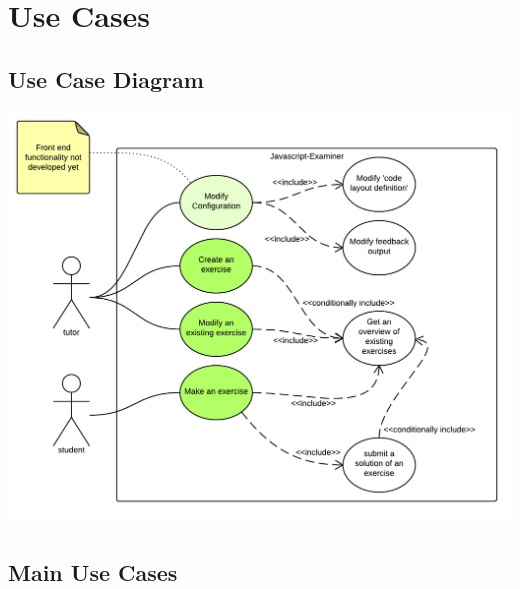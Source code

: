 \section{Use Cases}

\subsection{Use Case Diagram}
\includegraphics[scale=1]{appendices/diagrams-images/use-case-diagram}

\subsection{Main Use Cases}

